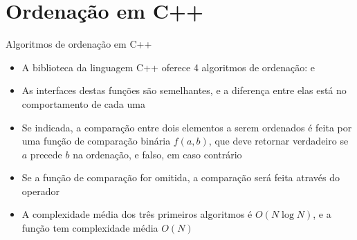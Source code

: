 \section{Ordenação em C++}

\begin{frame}[fragile]{Algoritmos de ordenação em C++}

    \begin{itemize}
        \item A biblioteca  da linguagem C++ oferece 4 algoritmos de
            ordenação:  e 

        \item As interfaces destas funções são semelhantes, e a diferença entre elas está 
            no comportamento de cada uma

        \item Se indicada, a comparação entre dois elementos a serem ordenados é feita por 
            uma função de comparação binária $f(a, b)$, que deve retornar verdadeiro se
            $a$ precede $b$ na ordenação, e falso, em caso contrário

        \item Se a função de comparação for omitida, a comparação será feita através do
            operador 

        \item A complexidade média dos três primeiros algoritmos é $O(N\log N)$, e a função
             tem complexidade média $O(N)$
    \end{itemize}

\end{frame}


